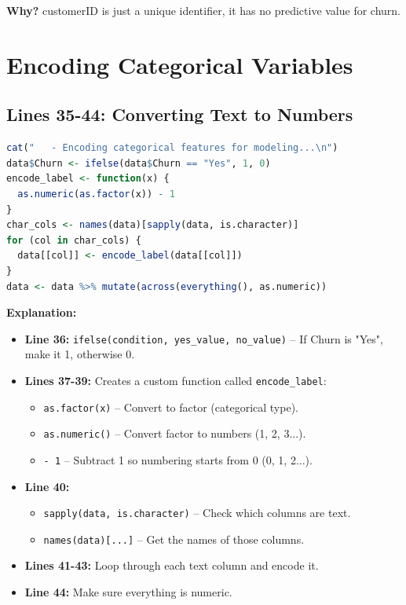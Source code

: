 \documentclass[12pt,a4paper]{article}
\begin{document}
\textbf{Why?} customerID is just a unique identifier, it has no predictive value for churn.

\section{Encoding Categorical Variables}

\subsection{Lines 35-44: Converting Text to Numbers}

\begin{lstlisting}[language=R]
cat("   - Encoding categorical features for modeling...\n")
data$Churn <- ifelse(data$Churn == "Yes", 1, 0)
encode_label <- function(x) {
  as.numeric(as.factor(x)) - 1
}
char_cols <- names(data)[sapply(data, is.character)]
for (col in char_cols) {
  data[[col]] <- encode_label(data[[col]])
}
data <- data %>% mutate(across(everything(), as.numeric))
\end{lstlisting}

\textbf{Explanation:}
\begin{itemize}
    \item \textbf{Line 36:} \texttt{ifelse(condition, yes\_value, no\_value)} -- If Churn is "Yes", make it 1, otherwise 0.
    \item \textbf{Lines 37-39:} Creates a custom function called \texttt{encode\_label}:
    \begin{itemize}
        \item \texttt{as.factor(x)} -- Convert to factor (categorical type).
        \item \texttt{as.numeric()} -- Convert factor to numbers (1, 2, 3...).
        \item \texttt{- 1} -- Subtract 1 so numbering starts from 0 (0, 1, 2...).
    \end{itemize}
    \item \textbf{Line 40:} 
    \begin{itemize}
        \item \texttt{sapply(data, is.character)} -- Check which columns are text.
        \item \texttt{names(data)[...]} -- Get the names of those columns.
    \end{itemize}
    \item \textbf{Lines 41-43:} Loop through each text column and encode it.
    \item \textbf{Line 44:} Make sure everything is numeric.
\end{itemize}
\end{document}
